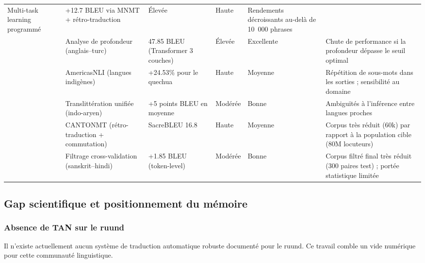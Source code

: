 \begin{longtable}{p{2.8cm}p{2.8cm}p{2.2cm}p{1.9cm}p{1.9cm}p{3.2cm}}
Multi-task learning programmé &
+12.7 \ac{BLEU} via \ac{MNMT} + rétro-traduction &
Élevée &
Haute &
Rendements décroissants au-delà de 10~000 phrases \\
\citeauthor{aci2025morphological} \cite{aci2025morphological} &
Analyse de profondeur (anglais--turc) &
47.85 \ac{BLEU} (Transformer 3 couches) &
Élevée &
Excellente &
Chute de performance si la profondeur dépasse le seuil optimal \\
\citeauthor{kann2022americasnli} \cite{kann2022americasnli} &
AmericasNLI (langues indigènes) &
+24.53\% pour le quechua &
Haute &
Moyenne &
Répétition de sous-mots dans les sorties ; sensibilité au domaine \\
\citeauthor{goyal2020efficient} \cite{goyal2020efficient} &
Translittération unifiée (indo-aryen) &
+5 points \ac{BLEU} en moyenne &
Modérée &
Bonne &
Ambiguïtés à l'inférence entre langues proches \\
\citeauthor{hong2024cantonmt} \cite{hong2024cantonmt} &
CANTONMT (rétro-traduction + commutation) &
SacreBLEU 16.8 &
Haute &
Moyenne &
Corpus très réduit (60k) par rapport à la population cible (80M locuteurs) \\
\citeauthor{rani2023filtering} \cite{rani2023filtering} &
Filtrage cross-validation (sanskrit--hindi) &
+1.85 \ac{BLEU} (token-level) &
Modérée &
Bonne &
Corpus filtré final très réduit (300 paires test) ; portée statistique limitée \\
\end{longtable}
\addtocounter{table}{-1}
{\captionsetup{hypcap=false}
\label{tab:synthese_travaux}}
\endgroup


\subsection{Gap scientifique et positionnement du mémoire}

\subsubsection{Absence de \ac{TAN} sur le ruund}

Il n'existe actuellement aucun système de traduction automatique robuste documenté pour le ruund. Ce travail comble un vide numérique pour cette communauté linguistique.

